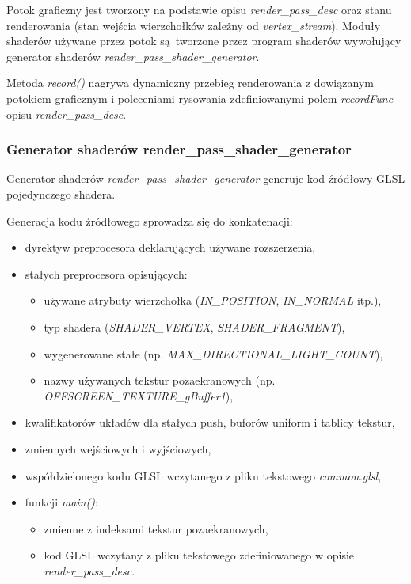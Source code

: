 Potok graficzny jest tworzony na podstawie opisu \textit{render\_pass\_desc} oraz stanu renderowania (stan wejścia wierzchołków zależny od \textit{vertex\_stream}).
Moduły shaderów używane przez potok są tworzone przez program shaderów wywołujący generator shaderów \textit{render\_pass\_shader\_generator}.

Metoda \textit{record()} nagrywa dynamiczny przebieg renderowania z dowiązanym potokiem graficznym i poleceniami rysowania zdefiniowanymi polem \textit{recordFunc} opisu \textit{render\_pass\_desc}.


\subsubsection{Generator shaderów render\_pass\_shader\_generator}
Generator shaderów \textit{render\_pass\_shader\_generator} generuje kod źródłowy GLSL pojedynczego shadera.

Generacja kodu źródłowego sprowadza się do konkatenacji:
\begin{itemize}
	\item dyrektyw preprocesora deklarujących używane rozszerzenia,
	\item stałych preprocesora opisujących:
	\begin{itemize}
		\item używane atrybuty wierzchołka (\textit{IN\_POSITION}, \textit{IN\_NORMAL} itp.),
		\item typ shadera (\textit{SHADER\_VERTEX}, \textit{SHADER\_FRAGMENT}),
		\item wygenerowane stałe (np. \textit{MAX\_DIRECTIONAL\_LIGHT\_COUNT}),
		\item nazwy używanych tekstur pozaekranowych (np. \textit{OFFSCREEN\_TEXTURE\_gBuffer1}),
	\end{itemize}
	\item kwalifikatorów układów dla stałych push, buforów uniform i tablicy tekstur,
	\item zmiennych wejściowych i wyjściowych,
	\item współdzielonego kodu GLSL wczytanego z pliku tekstowego \textit{common.glsl},
	\item funkcji \textit{main()}:
	\begin{itemize}
		\item zmienne z indeksami tekstur pozaekranowych,
		\item kod GLSL wczytany z pliku tekstowego zdefiniowanego w opisie \textit{render\_pass\_desc}.
	\end{itemize}
\end{itemize}


